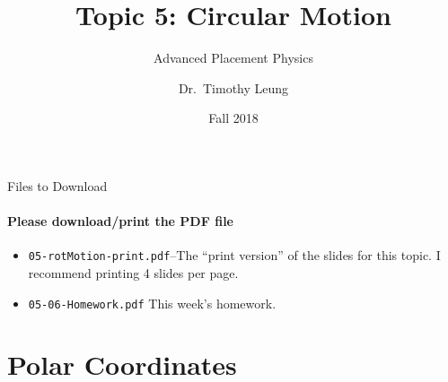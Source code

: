 \documentclass[12pt,compress,aspectratio=169]{beamer}
\title{Topic 5: Circular Motion}
\subtitle{Advanced Placement Physics}
\author[TML]{Dr.\ Timothy Leung}
\institute{Olympiads School}
\date{Fall 2018}
\begin{document}
\begin{frame}
  \maketitle
\end{frame}


\begin{frame}{Files to Download}
  \framesubtitle{Please download/print the PDF file}
  \begin{itemize}
  \item\texttt{05-rotMotion-print.pdf}--The ``print version'' of the slides for
    this topic. I recommend printing 4 slides per page.
  \item\texttt{05-06-Homework.pdf} This week's homework.
  \end{itemize}
\end{frame}




\section{Polar Coordinates}
\end{document}
